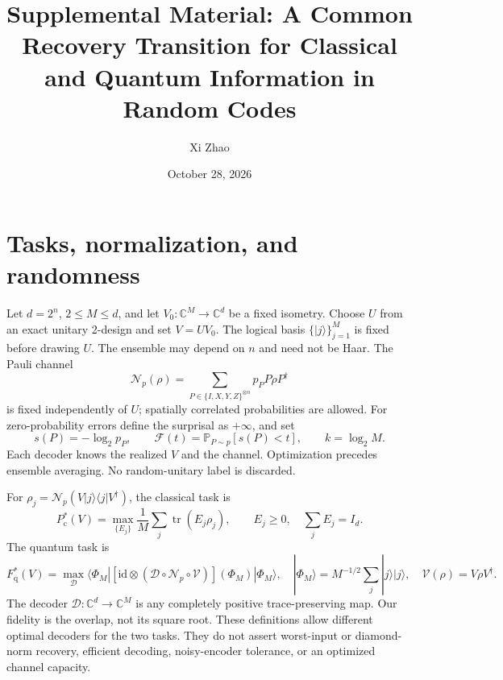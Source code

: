 \documentclass[aps,prl,onecolumn,superscriptaddress,amsmath,amssymb]{revtex4-2}
\newcommand{\Prb}{\mathbb P}
\newcommand{\N}{\mathcal N}
\newcommand{\tr}{\operatorname{tr}}
\newcommand{\Pc}{P_{\mathrm c}^{*}}
\newcommand{\Fq}{F_{\mathrm q}^{*}}
\newcommand{\Fs}{\mathcal F}
\begin{document}
\title{Supplemental Material: A Common Recovery Transition for Classical and Quantum Information in Random Codes}
\author{Xi Zhao}\noaffiliation
\date{October 28, 2026}
\maketitle

\section{Tasks, normalization, and randomness}

Let $d=2^n$, $2\le M\le d$, and let $V_0:\mathbb C^M\to\mathbb C^d$ be a fixed isometry. Choose $U$ from an exact unitary 2-design and set $V=UV_0$. The logical basis $\{|j\rangle\}_{j=1}^M$ is fixed before drawing $U$. The ensemble may depend on $n$ and need not be Haar. The Pauli channel
\begin{equation}
\N_p(\rho)=\sum_{P\in\{I,X,Y,Z\}^{\otimes n}}p_P P\rho P^\dagger
\end{equation}
is fixed independently of $U$; spatially correlated probabilities are allowed. For zero-probability errors define the surprisal as $+\infty$, and set
\begin{equation}
s(P)=-\log_2p_P,\qquad \Fs(t)=\Prb_{P\sim p}[s(P)<t],\qquad k=\log_2M.
\end{equation}
Each decoder knows the realized $V$ and the channel. Optimization precedes ensemble averaging. No random-unitary label is discarded.

For $\rho_j=\N_p(V|j\rangle\langle j|V^\dagger)$, the classical task is
\begin{equation}
\Pc(V)=\max_{\{E_j\}}\frac1M\sum_j\tr(E_j\rho_j),\qquad E_j\ge0,\quad\sum_jE_j=I_d.
\end{equation}
The quantum task is
\begin{equation}
\Fq(V)=\max_{\mathcal D}\langle\Phi_M|[\mathrm{id}\otimes(\mathcal D\circ\N_p\circ\mathcal V)](\Phi_M)|\Phi_M\rangle,
\quad |\Phi_M\rangle=M^{-1/2}\sum_j|j\rangle|j\rangle,
\quad\mathcal V(\rho)=V\rho V^\dagger.
\end{equation}
The decoder $\mathcal D:\mathbb C^d\to\mathbb C^M$ is any completely positive trace-preserving map. Our fidelity is the overlap, not its square root. These definitions allow different optimal decoders for the two tasks. They do not assert worst-input or diamond-norm recovery, efficient decoding, noisy-encoder tolerance, or an optimized channel capacity.
\end{document}
